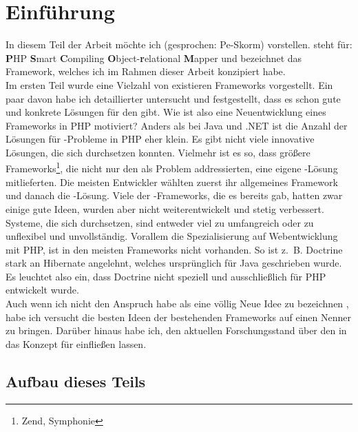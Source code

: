 \chapter{Einführung}

In diesem Teil der Arbeit möchte ich \PSCORM (gesprochen: Pe-Skorm) vorstellen. \PSCORM steht für: \textbf{P}HP \textbf{S}mart \textbf{C}ompiling \textbf{O}bject-\textbf{r}elational \textbf{M}apper und bezeichnet das Framework, welches ich im Rahmen dieser Arbeit konzipiert habe. \\
Im ersten Teil wurde eine Vielzahl von existieren Frameworks vorgestellt. Ein paar davon habe ich detaillierter untersucht und festgestellt, dass es schon gute und konkrete Lösungen für den \IM gibt. Wie ist also eine Neuentwicklung eines Frameworks in PHP motiviert? Anders als bei Java und .NET ist die Anzahl der Lösungen für \ORM-Probleme in PHP eher klein. Es gibt nicht viele innovative Lösungen, die sich durchsetzen konnten. Vielmehr ist es so, dass größere Frameworks\footnote{Zend, Symphonie}, die nicht nur den \IM als Problem addressierten, eine eigene \ORM-Lösung mitlieferten. Die meisten Entwickler wählten zuerst ihr allgemeines Framework und danach die \ORM-Lösung. Viele der \ORM-Frameworks, die es bereits gab, hatten zwar einige gute Ideen, wurden aber nicht weiterentwickelt und stetig verbessert. \\
Systeme, die sich durchsetzen, sind entweder viel zu umfangreich oder zu unflexibel und unvollständig. Vorallem die Spezialisierung auf Webentwicklung mit PHP, ist in den meisten Frameworks nicht vorhanden. So ist z.~B. Doctrine stark an Hibernate angelehnt, welches ursprünglich für Java geschrieben wurde. Es leuchtet also ein, dass Doctrine nicht speziell und ausschließlich für PHP entwickelt wurde. \\
Auch wenn ich nicht den Anspruch habe \PSCORM als eine völlig Neue Idee zu bezeichnen \cite{propel}, habe ich versucht die besten Ideen der bestehenden Frameworks auf einen Nenner zu bringen. Darüber hinaus habe ich, den aktuellen Forschungsstand über den \IM in das Konzept für \PSCORM einfließen lassen.

\section{Aufbau dieses Teils}

